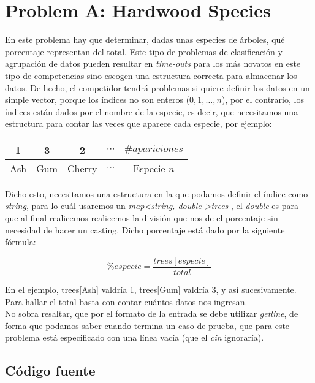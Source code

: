 \chapter{Problem A: Hardwood Species}

En este problema hay que determinar, dadas unas especies de árboles, qué porcentaje representan del total. Este tipo de problemas de clasificación y agrupación de datos pueden resultar en \emph{time-outs} para los más novatos en este tipo de competencias sino escogen una estructura correcta para almacenar los datos. De hecho, el competidor tendrá problemas si quiere definir los datos en un simple vector, porque los índices no son enteros ($0,1,\dots,n$), por el contrario, los índices están dados por el nombre de la especie, es decir, que necesitamos una estructura para contar las veces que aparece cada especie, por ejemplo:

\begin{center}
\begin{tabular}{c c c c c} 
	\hline	 
	\multicolumn{1}{|c}{1} &
	\multicolumn{1}{|c}{3} &
	\multicolumn{1}{|c}{2} &
	\multicolumn{1}{|c}{$\cdots$} &
	\multicolumn{1}{|c|}{$\# apariciones$} \\ \hline		
	\multicolumn{1}{c}{Ash} &
	\multicolumn{1}{c}{Gum} & 
	\multicolumn{1}{c}{Cherry} &
	\multicolumn{1}{c}{$\cdots$} &
	\multicolumn{1}{c}{Especie $n$} 	
\end{tabular}
\end{center}

Dicho esto, necesitamos una estructura en la que podamos definir el índice como \emph{string}, para lo cuál usaremos un \emph{map\textless string, double \textgreater trees }, el \emph{double} es para que al final realicemos realicemos la división que nos de el porcentaje sin necesidad de hacer un casting. Dicho porcentaje está dado por la siguiente fórmula: 

\begin{equation}
\% especie = \frac{trees[especie]}{total}
\end{equation}

En el ejemplo, trees[Ash] valdría 1, trees[Gum] valdría 3, y así sucesivamente. Para hallar el total basta con contar cuántos datos nos ingresan. \\

No sobra resaltar, que por el formato de la entrada se debe utilizar \emph{getline}, de forma que podamos saber cuando termina un caso de prueba, que para este problema está especificado con una línea vacía (que el \emph{cin} ignoraría).

\newpage

\section*{Código fuente}




